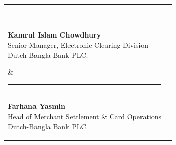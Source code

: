 \documentclass[10pt, a4paper]{article}
\begin{document}
\vspace{1.2cm}

\noindent
\begin{tabularx}{\textwidth}{@{}X X@{}}
    \parbox[t]{7cm}{
        \rule{5cm}{0.4pt} \\
        \textbf{Kamrul Islam Chowdhury} \\
        Senior Manager, Electronic Clearing Division \\
        Dutch-Bangla Bank PLC.
    } & 
    \parbox[t]{7cm}{\raggedleft
        \rule{5cm}{0.4pt} \\
        \textbf{Farhana Yasmin} \\
        Head of Merchant Settlement \& Card Operations \\
        Dutch-Bangla Bank PLC.
    }
\end{tabularx}
\end{document}
